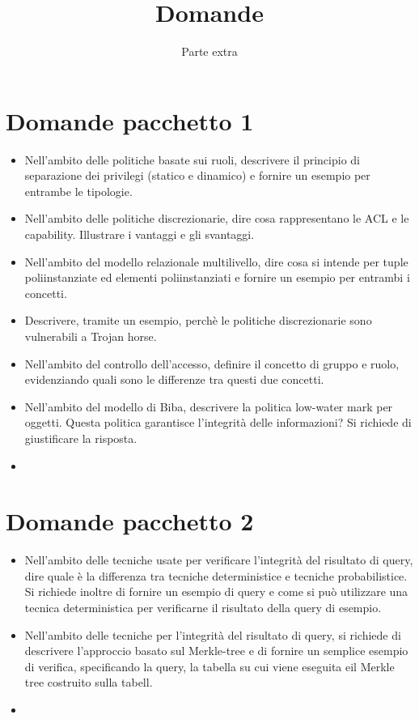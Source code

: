 \documentclass{report}
\title{\huge\textbf{{Domande}}}
\date{Parte extra}
\begin{document}
\maketitle
\tableofcontents
\newpage

\chapter{Domande pacchetto 1}
\begin{itemize}
    \item Nell'ambito delle politiche basate sui ruoli, descrivere il principio di separazione dei privilegi (statico e dinamico)
e fornire un esempio per entrambe le tipologie.
    \item Nell'ambito delle politiche discrezionarie, dire cosa rappresentano le ACL e le capability. Illustrare i vantaggi
e gli svantaggi.
    \item Nell'ambito del modello relazionale multilivello, dire cosa si intende per tuple poliinstanziate ed elementi
poliinstanziati e fornire un esempio per entrambi i concetti.
    \item Descrivere, tramite un esempio, perchè le politiche discrezionarie sono vulnerabili a Trojan horse.
    \item Nell'ambito del controllo dell'accesso, definire il concetto di gruppo e ruolo, evidenziando quali sono le differenze
tra questi due concetti.
    \item Nell'ambito del modello di Biba, descrivere la politica low-water mark per oggetti. Questa politica garantisce
l'integrità delle informazioni? Si richiede di giustificare la risposta.
    \item 
\end{itemize}

\chapter{Domande pacchetto 2}
\begin{itemize}
    \item Nell'ambito delle tecniche usate per verificare l'integrità del risultato di query, dire quale è la differenza tra
tecniche deterministice e tecniche probabilistice. Si richiede inoltre di fornire un esempio di query e come si
può utilizzare una tecnica deterministica per verificarne il risultato della query di esempio.
    \item Nell'ambito delle tecniche per l'integrità del risultato di query, si richiede di descrivere l'approccio basato sul
Merkle-tree e di fornire un semplice esempio di verifica, specificando la query, la tabella su cui viene eseguita
eil Merkle tree costruito sulla tabell.
    \item 
\end{itemize}
\end{document}
